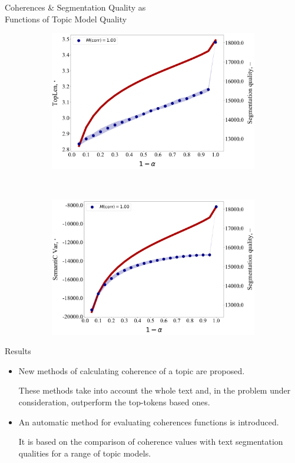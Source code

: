 \documentclass[russian]{beamer}
\begin{document}
\begin{frame}{Coherences \& Segmentation Quality as\\Functions of Topic Model Quality}
\begin{figure}[h]
\begin{subfigure}[t]{0.48\textwidth}
      \includegraphics[width=\linewidth]{toplen-iteration.jpg}
    \end{subfigure}
    ~
    \begin{subfigure}[t]{0.48\textwidth}
      \includegraphics[width=\linewidth]{semantic_var-iteration.jpg}
    \end{subfigure}
  \end{figure}
\end{frame}


\begin{frame}{Results}
  \begin{itemize}
  \setlength\itemsep{0.5cm}
  \item
    New methods of calculating coherence of a topic are proposed.
    
    \smallskip
    
    These methods take into account the whole text and, in the problem under consideration, outperform the top-tokens based ones.
  \item
    An automatic method for evaluating coherences functions is introduced.
    
    \smallskip
    
    It is based on the comparison of coherence values with text segmentation qualities for a range of topic models.
  \end{itemize}
\end{frame}
\end{document}
